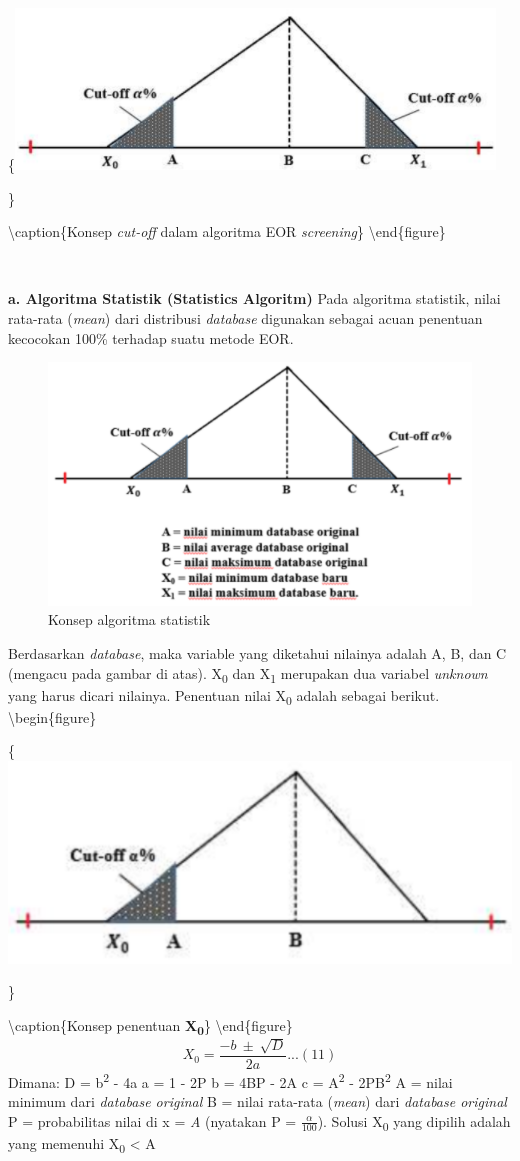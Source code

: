 \documentclass[
]{book}
\begin{document}
\{\centering \includegraphics[width=0.5\linewidth]{images/screening/cut-off}

\}

\textbackslash caption\{Konsep \emph{cut-off} dalam algoritma EOR \emph{screening}\}\label{fig:unnamed-chunk-16}
\textbackslash end\{figure\}

~

\textbf{a. Algoritma Statistik (Statistics Algoritm)}
Pada algoritma statistik, nilai rata-rata (\emph{mean}) dari distribusi \emph{database} digunakan sebagai acuan penentuan kecocokan 100\% terhadap suatu metode EOR.

\begin{figure}

{\centering \includegraphics[width=0.5\linewidth]{images/screening/algoritma_statistik} 

}

\caption{Konsep algoritma statistik}\label{fig:unnamed-chunk-17}
\end{figure}

Berdasarkan \emph{database}, maka variable yang diketahui nilainya adalah A, B, dan C (mengacu pada gambar di atas). X\textsubscript{0} dan X\textsubscript{1} merupakan dua variabel \emph{unknown} yang harus dicari nilainya. Penentuan nilai X\textsubscript{0} adalah sebagai berikut.
\textbackslash begin\{figure\}

\{\centering \includegraphics[width=0.5\linewidth]{images/screening/X0}

\}

\textbackslash caption\{Konsep penentuan \textbf{X\textsubscript{0}}\}\label{fig:unnamed-chunk-18}
\textbackslash end\{figure\}
\[X_0 = \frac{-b\ ±\ \sqrt{D} }{2a}...(11)\]
Dimana:
D = b\textsuperscript{2} - 4a
a = 1 - 2P
b = 4BP - 2A
c = A\textsuperscript{2} - 2PB\textsuperscript{2}
A = nilai minimum dari \emph{database original}
B = nilai rata-rata (\emph{mean}) dari \emph{database original}
P = probabilitas nilai di x = \emph{A} (nyatakan P = \(\frac{\alpha}{100}\)).
Solusi X\textsubscript{0} yang dipilih adalah yang memenuhi X\textsubscript{0} \textless{} A
\end{document}
